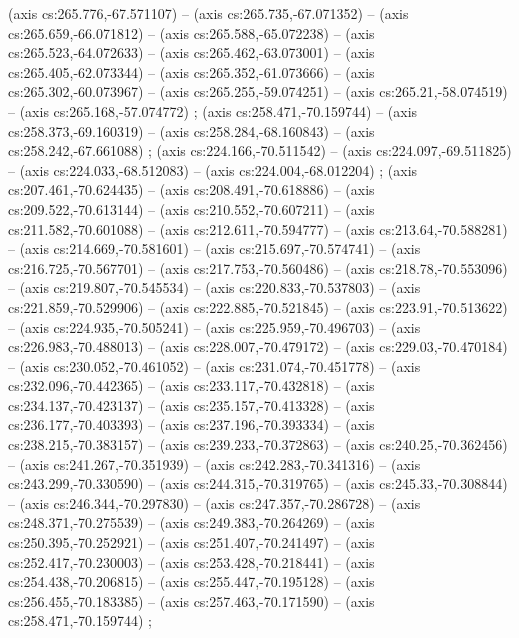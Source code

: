     (axis cs:265.776,-67.571107) --  (axis cs:265.735,-67.071352) --  (axis cs:265.659,-66.071812) --  (axis cs:265.588,-65.072238) --  (axis cs:265.523,-64.072633) --  (axis cs:265.462,-63.073001) --  (axis cs:265.405,-62.073344) --  (axis cs:265.352,-61.073666) --  (axis cs:265.302,-60.073967) --  (axis cs:265.255,-59.074251) --  (axis cs:265.21,-58.074519) --  (axis cs:265.168,-57.074772) ;
    (axis cs:258.471,-70.159744) --  (axis cs:258.373,-69.160319) --  (axis cs:258.284,-68.160843) --  (axis cs:258.242,-67.661088) ;
    (axis cs:224.166,-70.511542) --  (axis cs:224.097,-69.511825) --  (axis cs:224.033,-68.512083) --  (axis cs:224.004,-68.012204) ;
    (axis cs:207.461,-70.624435) --  (axis cs:208.491,-70.618886) --  (axis cs:209.522,-70.613144) --  (axis cs:210.552,-70.607211) --  (axis cs:211.582,-70.601088) --  (axis cs:212.611,-70.594777) --  (axis cs:213.64,-70.588281) --  (axis cs:214.669,-70.581601) --  (axis cs:215.697,-70.574741) --  (axis cs:216.725,-70.567701) --  (axis cs:217.753,-70.560486) --  (axis cs:218.78,-70.553096) --  (axis cs:219.807,-70.545534) --  (axis cs:220.833,-70.537803) --  (axis cs:221.859,-70.529906) --  (axis cs:222.885,-70.521845) --  (axis cs:223.91,-70.513622) --  (axis cs:224.935,-70.505241) --  (axis cs:225.959,-70.496703) --  (axis cs:226.983,-70.488013) --  (axis cs:228.007,-70.479172) --  (axis cs:229.03,-70.470184) --  (axis cs:230.052,-70.461052) --  (axis cs:231.074,-70.451778) --  (axis cs:232.096,-70.442365) --  (axis cs:233.117,-70.432818) --  (axis cs:234.137,-70.423137) --  (axis cs:235.157,-70.413328) --  (axis cs:236.177,-70.403393) --  (axis cs:237.196,-70.393334) --  (axis cs:238.215,-70.383157) --  (axis cs:239.233,-70.372863) --  (axis cs:240.25,-70.362456) --  (axis cs:241.267,-70.351939) --  (axis cs:242.283,-70.341316) --  (axis cs:243.299,-70.330590) --  (axis cs:244.315,-70.319765) --  (axis cs:245.33,-70.308844) --  (axis cs:246.344,-70.297830) --  (axis cs:247.357,-70.286728) --  (axis cs:248.371,-70.275539) --  (axis cs:249.383,-70.264269) --  (axis cs:250.395,-70.252921) --  (axis cs:251.407,-70.241497) --  (axis cs:252.417,-70.230003) --  (axis cs:253.428,-70.218441) --  (axis cs:254.438,-70.206815) --  (axis cs:255.447,-70.195128) --  (axis cs:256.455,-70.183385) --  (axis cs:257.463,-70.171590) --  (axis cs:258.471,-70.159744) ;
